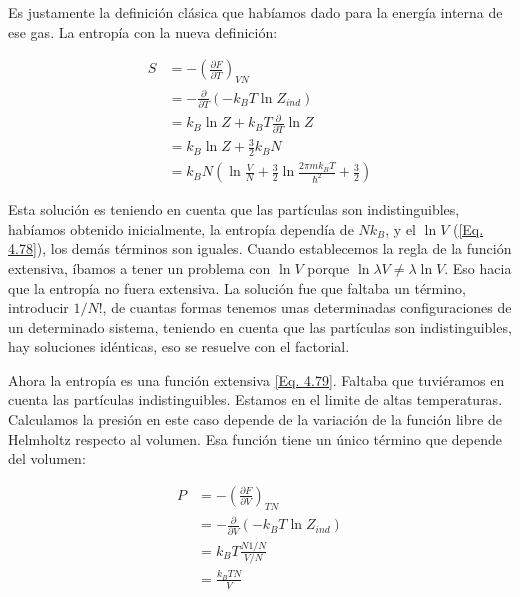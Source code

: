 \documentclass[11pt,fleqn]{book}
\begin{document}
Es justamente la definición clásica que habíamos dado para la energía interna de ese gas. La entropía con la nueva definición:

\begin{equation}
\begin{split}
    S&=-\left(\frac{\partial F}{\partial T}\right)_{VN}\\
    &= -\frac{\partial}{\partial T}(-k_{B}T\ln{Z_{ind}})\\
    &=k_{B}\ln{Z}+k_{B}T\frac{\partial}{\partial T}\ln{Z}\\
    &=k_{B}\ln{Z}+\frac{3}{2}k_{B}N\\
    &=k_{B}N\left(\ln{\frac{V}{N}}+\frac{3}{2}\ln{\frac{2\pi mk_{B}T}{\hslash^{2}}}+\frac{3}{2}\right)
      \end{split}  
    \label{Eq. 4.85}
\end{equation}

Esta solución es teniendo en cuenta que las partículas son indistinguibles, habíamos obtenido inicialmente, la entropía dependía de $Nk_{B}$, y el $\ln{V}$ (\ref{Eq. 4.78}), los demás términos son iguales. Cuando establecemos la regla de la función extensiva, íbamos a tener un problema con $\ln{V}$ porque $\ln{\lambda V}\neq\lambda\ln{V}$. Eso hacia que la entropía no fuera extensiva. La solución fue que faltaba un término, introducir $1/N!$, de cuantas formas tenemos unas determinadas configuraciones de un determinado sistema, teniendo en cuenta que las partículas son indistinguibles, hay soluciones idénticas, eso se resuelve con el factorial. 

Ahora la entropía es una función extensiva \ref{Eq. 4.79}. Faltaba que tuviéramos en cuenta las partículas indistinguibles. Estamos en el limite de altas temperaturas. Calculamos la presión en este caso depende de la variación de la función libre de Helmholtz respecto al volumen. Esa función tiene un único término que depende del volumen:

\begin{equation}
    \begin{split}
    P&=-\left(\frac{\partial F}{\partial V}\right)_{TN}\\
    &= -\frac{\partial}{\partial V}(-k_{B}T\ln{Z_{ind}})\\
    &=k_{B}T\frac{N1/N}{V/N}\\
    &=\frac{k_{B}TN}{V}\\
    \end{split}
    \label{Eq. 4.86}
\end{equation}
\end{document}
